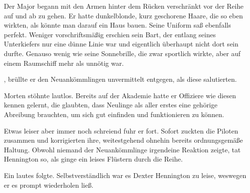 \par

Der Major begann mit den Armen hinter dem Rücken verschränkt vor der Reihe auf und ab zu gehen. Er hatte dunkelblonde, kurz geschorene Haare, die so eben wirkten, als könnte man darauf ein Haus bauen. Seine Uniform saß ebenfalls perfekt. Weniger vorschriftsmäßig erschien sein Bart, der entlang seines Unterkiefers nur eine dünne Linie war und eigentlich überhaupt nicht dort sein durfte. Genauso wenig wie seine Sonnebrille, die zwar sportlich wirkte, aber auf einem Raumschiff mehr als unnötig war.

\par

, brüllte er den Neuankömmlingen unvermittelt entgegen, als diese salutierten. 

\par

Morten stöhnte lautlos. Bereits auf der Akademie hatte er Offiziere wie diesen kennen gelernt, die glaubten, dass Neulinge als aller erstes eine gehörige Abreibung brauchten, um sich gut einfinden und funktionieren zu können.

\par

Etwas leiser aber immer noch schreiend fuhr er fort.  Sofort zuckten die Piloten zusammen und korrigierten ihre, weitestgehend ohnehin bereits ordnungsgemäße Haltung.  Obwohl niemand der Neuankömmlinge irgendeine Reaktion zeigte, tat Hennington so, als ginge ein leises Flüstern durch die Reihe. 

\par

Ein lautes  folgte. Selbstverständlich war es Dexter Hennington zu leise, weswegen er es prompt wiederholen ließ.

\par


